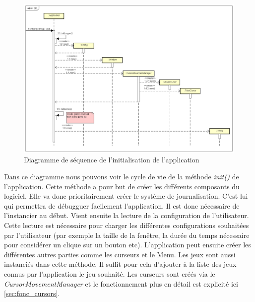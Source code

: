 \documentclass{polytech/polytech}
\begin{document}
\begin{figure}
    \centering
    \includegraphics[width=15cm]{img/diagrammes/seqInit.png}
    \caption{Diagramme de séquence de l'initialisation de l'application}
    \label{fig:seq_init}
\end{figure}

Dans ce diagramme nous pouvons voir le cycle de vie de la méthode \textit{init()} de l'application. Cette méthode a pour but de créer les différents composants du logiciel. Elle va donc prioritairement créer le système de journalisation. C'est lui qui permettra de débugguer facilement l'application. Il est donc nécessaire de l'instancier au début. Vient ensuite la lecture de la configuration de l'utilisateur. Cette lecture est nécessaire pour charger les différentes configurations souhaitées par l'utilisateur (par exemple la taille de la fenêtre, la durée du temps nécessaire pour considérer un clique sur un bouton etc).
L'application peut ensuite créer les différentes autres parties comme les curseurs et le Menu.
Les jeux sont aussi instanciés dans cette méthode. Il suffit pour cela d'ajouter à la liste des jeux connus par l'application le jeu souhaité. Les curseurs sont créés via le \textit{CursorMovementManager} et le fonctionnement plus en détail est explicité ici \autoref{sec:fonc_cursors}.
\end{document}
